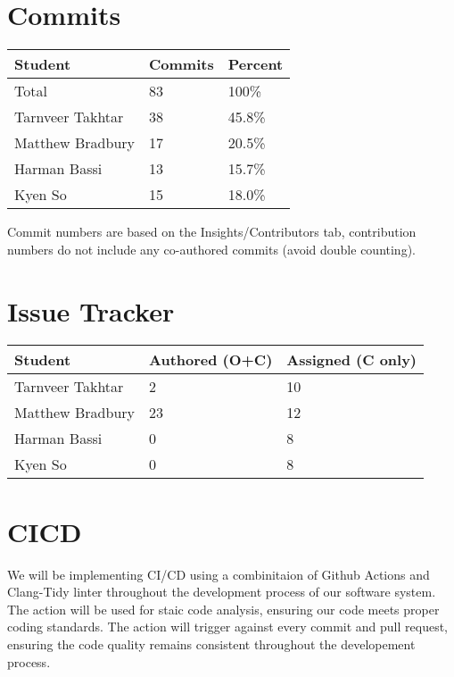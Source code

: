 \documentclass{article}
\begin{document}
\section{Commits}

\begin{table}[H]
\centering
\begin{tabular}{lll}
\toprule
\textbf{Student} & \textbf{Commits} & \textbf{Percent}\\
\midrule
Total & 83 & 100\% \\
Tarnveer Takhtar & 38 & 45.8\%\\
Matthew Bradbury & 17 & 20.5\%\\
Harman Bassi & 13 & 15.7\%\\
Kyen So & 15 & 18.0\%\\
\bottomrule
\end{tabular}
\end{table}

Commit numbers are based on the Insights/Contributors tab, contribution numbers do not include any co-authored commits (avoid double counting).

\section{Issue Tracker}

\begin{table}[H]
\centering
\begin{tabular}{lll}
\toprule
\textbf{Student} & \textbf{Authored (O+C)} & \textbf{Assigned (C only)}\\
\midrule
Tarnveer Takhtar & 2 & 10\\
Matthew Bradbury & 23 & 12\\
Harman Bassi & 0 & 8\\
Kyen So & 0 & 8\\
\bottomrule
\end{tabular}
\end{table}

\section{CICD}

We will be implementing CI/CD using a combinitaion of Github Actions and Clang-Tidy linter throughout the development process of our software system. 
The action will be used for staic code analysis, ensuring our code meets proper coding standards. 
The action will trigger against every commit and pull request, ensuring the code quality remains consistent throughout the developement process.
\end{document}
